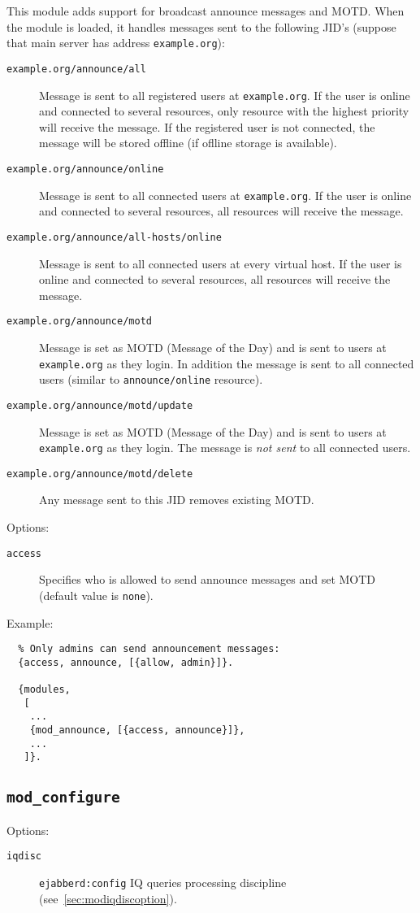 \documentclass[a4paper,10pt]{article}
\newcommand{\bracehack}{\def\{{\char"7B}\def\}{\char"7D}}
\newcommand{\ns}[1]{\texttt{#1}}
\newcommand{\jid}[1]{\texttt{#1}}
\newcommand{\term}[1]{\texttt{#1}}
\newcommand{\module}[1]{\texttt{#1}}
\newcommand{\modconfigure}{\module{mod\_configure}}
\newcommand{\titem}[1]{\item[\bracehack\texttt{#1}]}
\newcommand{\iqdiscitem}[1]{\titem{iqdisc} #1 IQ queries processing
discipline (see~\ref{sec:modiqdiscoption}).}
\begin{document}
This module adds support for broadcast announce messages and MOTD.
When the module is loaded, it handles messages sent to the following JID's
(suppose that main server has address \jid{example.org}):
\begin{description}
\titem{example.org/announce/all} Message is sent to all registered users at
\jid{example.org}.  If the user is online and connected to several resources,
only resource with the highest priority will receive the message.  If the
registered user is not connected, the message will be stored offline (if
oflline storage is available).
\titem{example.org/announce/online} Message is sent to all connected users at
\jid{example.org}.  If the user is online and connected to several resources,
all resources will receive the message.
\titem{example.org/announce/all-hosts/online} Message is sent to all connected
users at every virtual host.  If the user is online and connected to several
resources, all resources will receive the message.
\titem{example.org/announce/motd} Message is set as MOTD (Message of the Day)
and is sent to users at \jid{example.org} as they login.  In addition the
message is sent to all connected users (similar to \term{announce/online}
resource).
\titem{example.org/announce/motd/update} Message is set as MOTD (Message of the
Day) and is sent to users at \jid{example.org} as they login.  The message
is \emph{not sent} to all connected users.
\titem{example.org/announce/motd/delete} Any message sent to this JID
removes existing MOTD.
\end{description}

Options:
\begin{description}
\titem{access} Specifies who is allowed to send announce messages
and set MOTD (default value is \term{none}).
\end{description}

Example:
\begin{verbatim}
  % Only admins can send announcement messages:
  {access, announce, [{allow, admin}]}.

  {modules,
   [
    ...
    {mod_announce, [{access, announce}]},
    ...
   ]}.
\end{verbatim}


\subsection{\modconfigure{}}
\label{sec:modconfigure}

Options:
\begin{description}
\iqdiscitem{\ns{ejabberd:config}}
\end{description}
\end{document}
